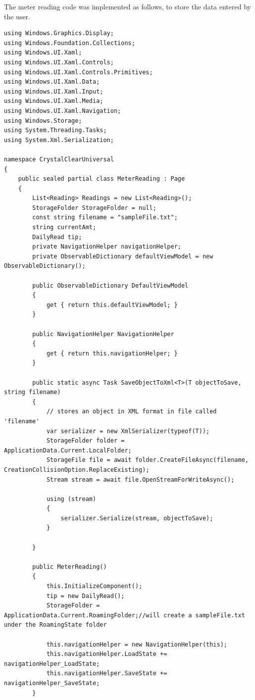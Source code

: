 \documentclass[runningheads,a4paper]{llncs}
\begin{document}
The meter reading code was implemented as follows, to store the data entered by the user.
\begin{lstlisting}
using Windows.Graphics.Display;
using Windows.Foundation.Collections;
using Windows.UI.Xaml;
using Windows.UI.Xaml.Controls;
using Windows.UI.Xaml.Controls.Primitives;
using Windows.UI.Xaml.Data;
using Windows.UI.Xaml.Input;
using Windows.UI.Xaml.Media;
using Windows.UI.Xaml.Navigation;
using Windows.Storage;
using System.Threading.Tasks;
using System.Xml.Serialization;

namespace CrystalClearUniversal
{
    public sealed partial class MeterReading : Page
    {
        List<Reading> Readings = new List<Reading>();
        StorageFolder StorageFolder = null;
        const string filename = "sampleFile.txt";
        string currentAmt;
        DailyRead tip;
        private NavigationHelper navigationHelper;
        private ObservableDictionary defaultViewModel = new ObservableDictionary();

        public ObservableDictionary DefaultViewModel
        {
            get { return this.defaultViewModel; }
        }

        public NavigationHelper NavigationHelper
        {
            get { return this.navigationHelper; }
        }

        public static async Task SaveObjectToXml<T>(T objectToSave, string filename)
        {
            // stores an object in XML format in file called 'filename'
            var serializer = new XmlSerializer(typeof(T));
            StorageFolder folder = ApplicationData.Current.LocalFolder;
            StorageFile file = await folder.CreateFileAsync(filename, CreationCollisionOption.ReplaceExisting);
            Stream stream = await file.OpenStreamForWriteAsync();

            using (stream)
            {
                serializer.Serialize(stream, objectToSave);
            }

        }

        public MeterReading()
        {
            this.InitializeComponent();
            tip = new DailyRead();
            StorageFolder = ApplicationData.Current.RoamingFolder;//will create a sampleFile.txt under the RoamingState folder

            this.navigationHelper = new NavigationHelper(this);
            this.navigationHelper.LoadState += navigationHelper_LoadState;
            this.navigationHelper.SaveState += navigationHelper_SaveState;
        }


\end{lstlisting}
\end{document}
